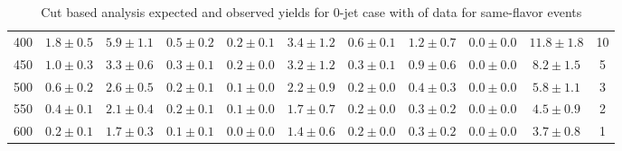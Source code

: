 \begin{table}
{\begin{center}
\begin{tabular}{l c c c c c c c c c c }
400 & $1.8\pm0.5$ & $5.9\pm1.1$ & $0.5\pm0.2$ & $0.2\pm0.1$ & $3.4\pm1.2$ & $0.6\pm0.1$ & $1.2\pm0.7$ & $0.0\pm0.0$ & $11.8\pm1.8$ & 10 \\
450 & $1.0\pm0.3$ & $3.3\pm0.6$ & $0.3\pm0.1$ & $0.2\pm0.0$ & $3.2\pm1.2$ & $0.3\pm0.1$ & $0.9\pm0.6$ & $0.0\pm0.0$ & $8.2\pm1.5$ & 5 \\
500 & $0.6\pm0.2$ & $2.6\pm0.5$ & $0.2\pm0.1$ & $0.1\pm0.0$ & $2.2\pm0.9$ & $0.2\pm0.0$ & $0.4\pm0.3$ & $0.0\pm0.0$ & $5.8\pm1.1$ & 3 \\
550 & $0.4\pm0.1$ & $2.1\pm0.4$ & $0.2\pm0.1$ & $0.1\pm0.0$ & $1.7\pm0.7$ & $0.2\pm0.0$ & $0.3\pm0.2$ & $0.0\pm0.0$ & $4.5\pm0.9$ & 2 \\
600 & $0.2\pm0.1$ & $1.7\pm0.3$ & $0.1\pm0.1$ & $0.0\pm0.0$ & $1.4\pm0.6$ & $0.2\pm0.0$ & $0.3\pm0.2$ & $0.0\pm0.0$ & $3.7\pm0.8$ & 1 \\
\hline
\end{tabular}
\end{center}
}
\caption{Cut based analysis expected and observed yields for 0-jet case with \intlumi of data for same-flavor events}
\label{tab:cutbase_inputs_sf_0j_data}
\end{table}
